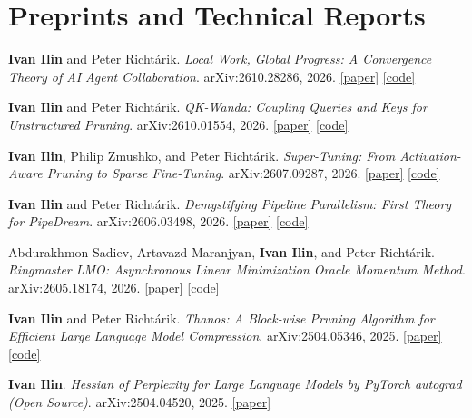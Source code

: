\documentclass[10pt,letterpaper]{article}
\newenvironment{publist}{%
  \begin{enumerate}[
    leftmargin=1.75em,
    label=\textcolor{Muted}{[\arabic*]},
    itemsep=0.34em,
    topsep=0.12em,
    parsep=0pt,
    partopsep=0pt
  ]\small\raggedright
}{%
  \end{enumerate}
}
\begin{document}
\section{Preprints and Technical Reports}

\begin{publist}
  \item \textbf{Ivan Ilin} and Peter Richt\'arik. \textit{Local Work, Global Progress: A Convergence Theory of AI Agent Collaboration}. arXiv:2610.28286, 2026. \href{https://arxiv.org/abs/2610.28286}{[paper]} \href{https://github.com/vectozavr/local-work-global-progress}{[code]}

  \item \textbf{Ivan Ilin} and Peter Richt\'arik. \textit{QK-Wanda: Coupling Queries and Keys for Unstructured Pruning}. arXiv:2610.01554, 2026. \href{https://arxiv.org/abs/2610.01554}{[paper]} \href{https://github.com/vectozavr/qk-wanda}{[code]}

  \item \textbf{Ivan Ilin}, Philip Zmushko, and Peter Richt\'arik. \textit{Super-Tuning: From Activation-Aware Pruning to Sparse Fine-Tuning}. arXiv:2607.09287, 2026. \href{https://arxiv.org/abs/2607.09287}{[paper]} \href{https://github.com/vectozavr/SuperTuning}{[code]}

  \item \textbf{Ivan Ilin} and Peter Richt\'arik. \textit{Demystifying Pipeline Parallelism: First Theory for PipeDream}. arXiv:2606.03498, 2026. \href{https://arxiv.org/abs/2606.03498}{[paper]} \href{https://github.com/vectozavr/randomized-pipedream}{[code]}

  \item Abdurakhmon Sadiev, Artavazd Maranjyan, \textbf{Ivan Ilin}, and Peter Richt\'arik. \textit{Ringmaster LMO: Asynchronous Linear Minimization Oracle Momentum Method}. arXiv:2605.18174, 2026. \href{https://arxiv.org/abs/2605.18174}{[paper]} \href{https://github.com/vectozavr/ringmaster-lmo}{[code]}

  \item \textbf{Ivan Ilin} and Peter Richt\'arik. \textit{Thanos: A Block-wise Pruning Algorithm for Efficient Large Language Model Compression}. arXiv:2504.05346, 2025. \href{https://arxiv.org/abs/2504.05346}{[paper]} \href{https://github.com/vectozavr/thanos}{[code]}

  \item \textbf{Ivan Ilin}. \textit{Hessian of Perplexity for Large Language Models by PyTorch autograd (Open Source)}. arXiv:2504.04520, 2025. \href{https://arxiv.org/abs/2504.04520}{[paper]}
\end{publist}
\end{document}
